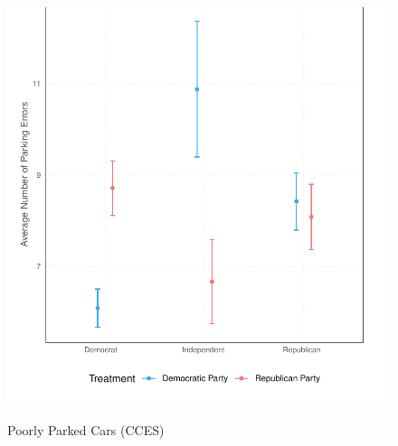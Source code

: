 \documentclass[12pt, letterpaper]{article}
\begin{document}
\clearpage
\begin{figure}[!htbp]
\centering
\caption{Poorly Parked Cars (CCES)}
\includegraphics[]{../figs/parking_cces.pdf}
\label{fig:parking_cces}
\end{figure}
\end{document}
